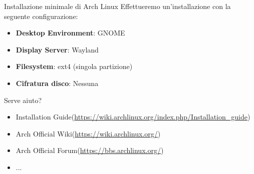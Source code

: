 \begin{frame}{Installazione minimale di Arch Linux}
    Effettueremo un'installazione con la seguente configurazione:
    \begin{itemize}
        \item \textbf{Desktop Environment}: GNOME
        \item \textbf{Display Server}: Wayland
        \item \textbf{Filesystem}: ext4 (singola partizione)
        \item \textbf{Cifratura disco}: Nessuna
    \end{itemize}
\end{frame}

\begin{frame}{Serve aiuto?}
    \begin{itemize}
        \item Installation Guide(\url{https://wiki.archlinux.org/index.php/Installation_guide})
        \item Arch Official Wiki(\url{https://wiki.archlinux.org/})
        \item Arch Official Forum(\url{https://bbs.archlinux.org/})
        \item ...
    \end{itemize}
\end{frame}